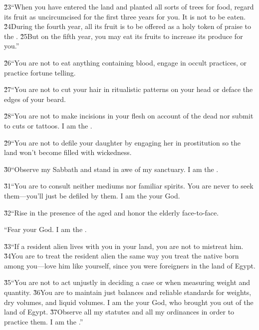 \v{23}``When you have entered the land and planted all sorts of trees for food, regard its fruit as uncircumcised for the first three years for you. It is not to be eaten. \v{24}During the fourth year, all its fruit is to be offered as a holy token of praise to the . \v{25}But on the fifth year, you may eat its fruits to increase its produce for you.''

\v{26}``You are not to eat anything containing blood, engage in occult practices, or practice fortune telling.

\v{27}``You are not to cut your hair in ritualistic patterns on your head or deface the edges of your beard.

\v{28}``You are not to make incisions in your flesh on account of the dead nor submit to cuts or tattoos. I am the .

\v{29}``You are not to defile your daughter by engaging her in prostitution so the land won't become filled with wickedness.

\v{30}``Observe my Sabbath and stand in awe of my sanctuary. I am the .

\v{31}``You are to consult neither mediums nor familiar spirits. You are never to seek them---you'll just be defiled by them. I am the  your God.

\v{32}``Rise in the presence of the aged and honor the elderly face-to-face.

``Fear your God. I am the .

\v{33}``If a resident alien lives with you in your land, you are not to mistreat him. \v{34}You are to treat the resident alien the same way you treat the native born among you---love him like yourself, since you were foreigners in the land of Egypt.

\v{35}``You are not to act unjustly in deciding a case or when measuring weight and quantity. \v{36}You are to maintain just balances and reliable standards for weights, dry volumes, and liquid volumes. I am the  your God, who brought you out of the land of Egypt. \v{37}Observe all my statutes and all my ordinances in order to practice them. I am the .''

